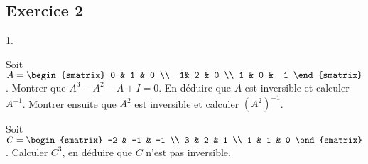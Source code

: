 \documentclass[11pt]{article}%
\begin{document}
\subsection*{Exercice 2}
\noindent
\begin{noliste}{1.}
\item Soit $A = \begin{smatrix} 0 & 1 & 0   \\ -1& 2 & 0  \\ 1 & 0 & -1 
 \end{smatrix}$. 
 Montrer que $A^3 - A^2 - A + I = 0$. En déduire que $A$ est inversible 
et calculer $A^{-1}$.
 Montrer ensuite que $A^2$ est inversible et calculer $(A^2)^{-1}$.
\item Soit $C = \begin{smatrix} -2 & -1 & -1 \\ 3 &  2 & 1 \\  1 & 1 & 
0 \end{smatrix}$. Calculer $C^3$, en déduire que $C$ n'est pas 
inversible.
\end{noliste}
\end{document}
